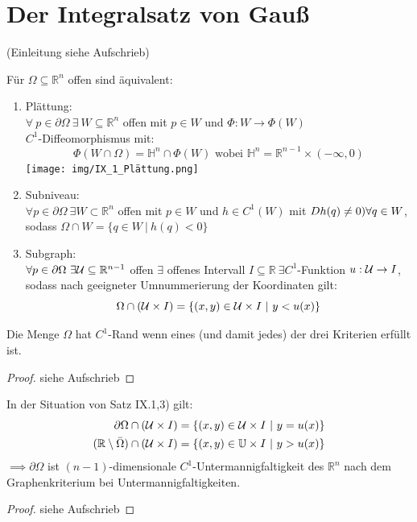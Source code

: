 \chapter{Der Integralsatz von Gauß}

(Einleitung siehe Aufschrieb)

\begin{theorem}
  Für $\Omega \subseteq \mathbb{R}^n$ offen sind äquivalent:
  \begin{enumerate}
    \item Plättung:\\
      $\forall \ p \in \partial \Omega \ \exists \ W \subseteq \mathbb{R}^n$ offen mit $p \in W$ und $\Phi: W\to \Phi(W)$\\
      $C^1$-Diffeomorphismus mit:
      $$\Phi(W \cap \Omega) = \mathbb{H}^n \cap \Phi(W) \text{ wobei } \mathbb{H}^n = \mathbb{R}^{n-1} \times (-\infty, 0)$$
      \texttt{[image: img/IX\_1\_Plättung.png]}
    \item Subniveau:\\
      $\forall p\in \partial \Omega \ \exists W \subset \mathbb{R}^n$ offen mit $p \in W$ und $h \in C^1(W)$ mit $Dh(q) \neq 0) \\\forall q \in W$, sodass $\Omega \cap W = \{q \in W \ | \ h(q) < 0\}$
    \item Subgraph:\\
      $\forall p \in \partial\Omega \ \exists \mathcal{U} \subseteq \mathbb{R}^{n-1}$ offen $\exists$ offenes Intervall $I \subseteq \mathbb{R} \ \exists C^1$-Funktion $u: \mathcal{U} \to I$, sodass nach geeigneter Umnummerierung der Koordinaten gilt:
      $$\Omega \cap (\mathcal{U} \times I) = \{(x,y) \in \mathcal{U} \times I \ | \ y < u(x)\}$$
  \end{enumerate}
  Die Menge $\Omega$ hat $C^1$-Rand wenn eines (und damit jedes) der drei Kriterien erfüllt ist.
\end{theorem}
\begin{proof}
  siehe Aufschrieb
\end{proof}

\newpage
\begin{lemma}
  In der Situation von Satz IX.1,3) gilt:
  \begin{align*}
    \partial \Omega \cap(\mathcal{U}\times I) &= \{(x,y) \in \mathcal{U} \times I \ | \ y = u(x)\}\\
    (\mathbb{R}\setminus \bar{\Omega}) \cap (\mathcal{U}\times I) &= \{(x,y) \in \mathbb{U} \times I \ | \ y > u(x)\}
  \end{align*}
  $\implies \partial \Omega$ ist $(n-1)$-dimensionale $C^1$-Untermannigfaltigkeit des $\mathbb{R}^n$ nach dem Graphenkriterium bei Untermannigfaltigkeiten.
\end{lemma}
\begin{proof}
  siehe Aufschrieb
\end{proof}

